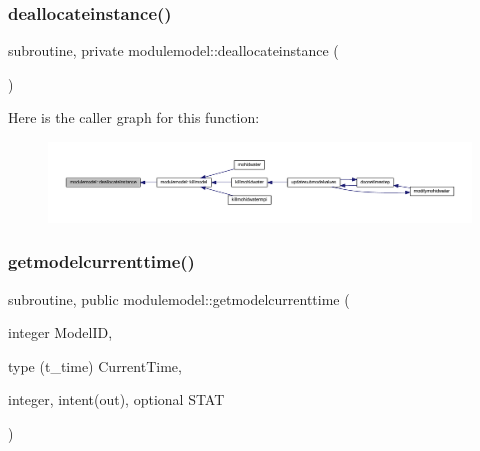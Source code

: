 \subsubsection{\texorpdfstring{deallocateinstance()}{deallocateinstance()}}
{\footnotesize\ttfamily subroutine, private modulemodel\+::deallocateinstance (\begin{DoxyParamCaption}{ }\end{DoxyParamCaption})\hspace{0.3cm}{\ttfamily [private]}}

Here is the caller graph for this function\+:\nopagebreak
\begin{figure}[H]
\begin{center}
\leavevmode
\includegraphics[width=350pt]{namespacemodulemodel_aa1baf5876ac43380b98e011bcf1517da_icgraph}
\end{center}
\end{figure}
\mbox{\label{namespacemodulemodel_a16524bfd3d2f97fbf9b45e5e99e495e8}} 
\subsubsection{\texorpdfstring{getmodelcurrenttime()}{getmodelcurrenttime()}}
{\footnotesize\ttfamily subroutine, public modulemodel\+::getmodelcurrenttime (\begin{DoxyParamCaption}\item[{integer}]{Model\+ID,  }\item[{type (t\+\_\+time)}]{Current\+Time,  }\item[{integer, intent(out), optional}]{S\+T\+AT }\end{DoxyParamCaption})}

